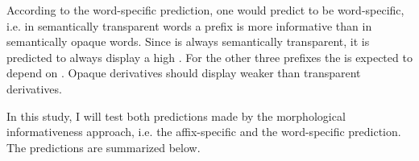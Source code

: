According to the word-specific prediction, one would predict  to be word-specific, i.e. in semantically transparent words a prefix is more informative than in semantically opaque words. Since  is always semantically transparent, it is predicted to always display a high . For the other three prefixes the  is expected to depend on . Opaque derivatives should display weaker  than transparent derivatives. 

In this study, I will test both predictions made by the morphological informativeness approach, i.e. the affix-specific and the word-specific prediction. The predictions are summarized below.


